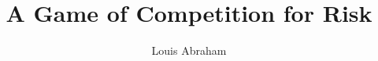 \documentclass[preprint,12pt,authoryear]{elsarticle}
\theoremstyle{definition}
\begin{document}
\begin{frontmatter}



\title{A Game of Competition for Risk}


\author[inst1,inst2]{Louis Abraham}

\address[inst1]{Université Paris 1 Panthéon--Sorbonne}

\address[inst2]{Association Française d'Épargne et de Retraite (AFER)}

            




\end{frontmatter}
\end{document}
